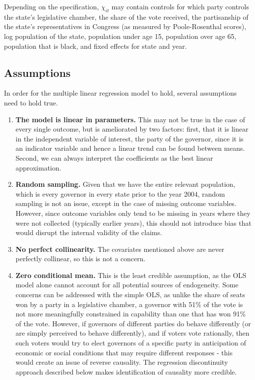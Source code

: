 \documentclass{article}
\begin{document}
Depending on the specification, $\chi_{it}$ may contain controls for which party controls the state's legislative chamber, the share of the vote received, the partisanship of the state's representatives in Congress (as measured by Poole-Rosenthal scores), log population of the state, population under age 15, population over age 65, population that is black, and fixed effects for state and year. 

\subsection{Assumptions}

In order for the multiple linear regression model to hold, several assumptions need to hold true.
\begin{enumerate}
\item \textbf{The model is linear in parameters.} This may not be true in the case of every single outcome, but is ameliorated by two factors: first, that it is linear in the independent variable of interest, the party of the governor, since it is an indicator variable and hence a linear trend can be found between means. Second, we can always interpret the coefficients as the best linear approximation.

\item \textbf{Random sampling.} Given that we have the entire relevant population, which is every governor in every state prior to the year 2004, random sampling is not an issue, except in the case of missing outcome variables. However, since outcome variables only tend to be missing in years where they were not collected (typically earlier years), this should not introduce bias that would disrupt the internal validity of the claims.

\item \textbf{No perfect collinearity.} The covariates mentioned above are never perfectly collinear, so this is not a concern. 

\item \textbf{Zero conditional mean.} This is the least credible assumption, as the OLS model alone cannot account for all potential sources of endogeneity. Some concerns can be addressed with the simple OLS, as unlike the share of seats won by a party in a legislative chamber, a governor with 51\% of the vote is not more meaningfully constrained in capability than one that has won 91\% of the vote. However, if governors of different parties do behave differently (or are simply perceived to behave differently), and if voters vote rationally, then such voters would try to elect governors of a specific party in anticipation of economic or social conditions that may require different responses - this would create an issue of reverse causality. The regression discontinuity approach described below makes identification of causality more credible.


\end{enumerate}
\end{document}
